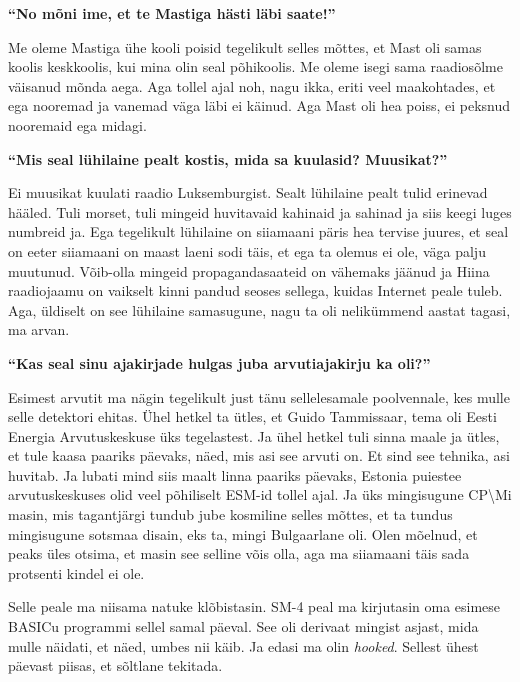 \textbf{\enquote{No mõni ime, et te Mastiga hästi läbi saate!}}

Me oleme Mastiga ühe kooli poisid tegelikult selles mõttes, et Mast oli samas 
koolis keskkoolis, kui mina olin seal põhikoolis. Me oleme isegi sama 
raadiosõlme väisanud mõnda aega. Aga tollel ajal noh, nagu ikka, eriti veel 
maakohtades, et ega nooremad ja vanemad väga läbi ei käinud. Aga Mast oli hea 
poiss, ei peksnud nooremaid ega midagi. 

\textbf{\enquote{Mis seal lühilaine pealt kostis, mida sa kuulasid? Muusikat?}}

Ei muusikat kuulati raadio Luksemburgist. Sealt lühilaine pealt tulid erinevad 
hääled. Tuli morset, tuli mingeid huvitavaid kahinaid ja sahinad ja siis keegi 
luges numbreid ja. Ega tegelikult lühilaine on siiamaani päris hea tervise 
juures, et seal on  eeter siiamaani on  maast laeni sodi täis, et ega ta olemus 
ei ole, väga palju muutunud. Võib-olla mingeid propagandasaateid on vähemaks 
jäänud ja Hiina raadiojaamu on vaikselt kinni pandud seoses sellega, kuidas 
Internet peale tuleb. Aga, üldiselt on see lühilaine samasugune, nagu ta oli 
nelikümmend aastat tagasi, ma arvan.

\textbf{\enquote{Kas seal sinu ajakirjade hulgas juba arvutiajakirju ka oli?}}

Esimest arvutit ma nägin tegelikult just tänu sellelesamale poolvennale, kes 
mulle selle detektori ehitas. Ühel hetkel ta ütles, et Guido 
Tammissaar, tema oli Eesti Energia 
Arvutuskeskuse üks tegelastest. Ja ühel 
hetkel tuli sinna maale ja ütles, et tule kaasa paariks päevaks, näed, mis asi 
see arvuti on. Et sind see tehnika, asi huvitab. Ja lubati mind siis maalt 
linna paariks päevaks, Estonia puiestee arvutuskeskuses olid veel põhiliselt 
ESM-id tollel ajal. Ja 
üks mingisugune CP\textbackslash Mi 
masin, mis tagantjärgi tundub jube kosmiline selles mõttes, et ta tundus 
mingisugune sotsmaa disain, eks ta, mingi Bulgaarlane oli. Olen mõelnud, et 
peaks üles otsima, et  masin see selline võis olla, aga ma siiamaani täis sada 
protsenti kindel ei ole. 

Selle peale ma niisama natuke klõbistasin. 
SM-4 peal ma 
kirjutasin oma esimese BASICu programmi sellel samal 
päeval. See oli derivaat mingist asjast, mida mulle näidati, et näed, umbes nii 
käib. Ja edasi ma olin \emph{hooked}. Sellest ühest päevast piisas, et sõltlane 
tekitada. 

